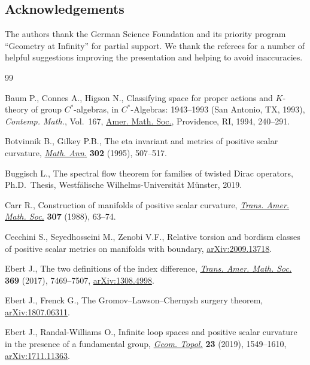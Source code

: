 \documentclass[10pt,a4paper]{amsart}
\numberwithin{equation}{section}
\begin{document}
\subsection*{Acknowledgements}
The authors thank the German Science Foundation and its priority program ``Geometry at Infinity'' for partial support. We thank the
referees for a number of helpful suggestions improving the presentation and helping to avoid inaccuracies.


\begin{thebibliography}{99}
\footnotesize\itemsep=0pt

Baum P., Connes A., Higson N., Classifying space for proper actions and
 {$K$}-theory of group {$C^\ast$}-algebras, in {$C^\ast$}-Algebras: 1943--1993
 ({S}an {A}ntonio, {TX}, 1993), \textit{Contemp. Math.}, Vol.~167, \href{https://doi.org/10.1090/conm/167/1292018}{Amer. Math.
 Soc.}, Providence, RI, 1994, 240--291.

Botvinnik B., Gilkey P.B., The eta invariant and metrics of positive scalar
 curvature, \href{https://doi.org/10.1007/BF01444505}{\textit{Math. Ann.}} \textbf{302} (1995), 507--517.

Buggisch L., The spectral flow theorem for families of twisted {D}irac
 operators, Ph.D.~Thesis, {W}estf\"alische Wilhelms-Universit\"at M\"unster,
 2019.

Carr R., Construction of manifolds of positive scalar curvature, \href{https://doi.org/10.2307/2000751}{\textit{Trans.
 Amer. Math. Soc.}} \textbf{307} (1988), 63--74.

Cecchini S., Seyedhosseini M., Zenobi V.F., Relative torsion and bordism
 classes of positive scalar metrics on manifolds with boundary,
 \href{https://arxiv.org/abs/2009.13718}{arXiv:2009.13718}.

Ebert J., The two definitions of the index difference, \href{https://doi.org/10.1090/tran/7133}{\textit{Trans. Amer.
 Math. Soc.}} \textbf{369} (2017), 7469--7507, \href{https://arxiv.org/abs/1308.4998}{arXiv:1308.4998}.

Ebert J., Frenck G., The Gromov--Lawson--Chernysh surgery theorem,
 \href{https://arxiv.org/abs/1807.06311}{arXiv:1807.06311}.

Ebert J., Randal-Williams O., Infinite loop spaces and positive scalar
 curvature in the presence of a fundamental group, \href{https://doi.org/10.2140/gt.2019.23.1549}{\textit{Geom. Topol.}}
 \textbf{23} (2019), 1549--1610, \href{https://arxiv.org/abs/1711.11363}{arXiv:1711.11363}.


\end{thebibliography}
\end{document}
